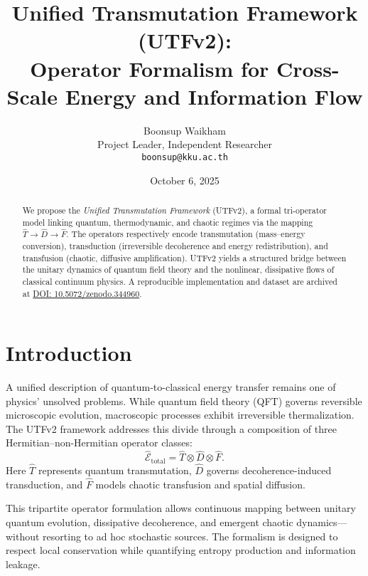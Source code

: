 \documentclass[11pt]{article}
\title{\textbf{Unified Transmutation Framework (UTFv2):\\
Operator Formalism for Cross-Scale Energy and Information Flow}}
\author{
  Boonsup Waikham\\
  \small Project Leader, Independent Researcher\\
  \small \texttt{boonsup@kku.ac.th}
}
\date{October 6, 2025}
\begin{document}
\maketitle

\begin{abstract}
We propose the \emph{Unified Transmutation Framework} (UTFv2), a formal tri-operator model 
linking quantum, thermodynamic, and chaotic regimes via the mapping
$\hat{T} \rightarrow \hat{D} \rightarrow \hat{F}$.
The operators respectively encode transmutation (mass–energy conversion),
transduction (irreversible decoherence and energy redistribution),
and transfusion (chaotic, diffusive amplification).
UTFv2 yields a structured bridge between the unitary dynamics of
quantum field theory and the nonlinear, dissipative flows of
classical continuum physics.
A reproducible implementation and dataset are archived at
\href{https://doi.org/10.5072/zenodo.344960}{DOI: 10.5072/zenodo.344960}.
\end{abstract}


\section{Introduction}

A unified description of quantum-to-classical energy transfer remains
one of physics' unsolved problems.
While quantum field theory (QFT) governs reversible microscopic
evolution, macroscopic processes exhibit irreversible thermalization.
The UTFv2 framework addresses this divide through a composition of
three Hermitian–non-Hermitian operator classes:
\begin{equation}
    \hat{\mathcal{E}}_{\mathrm{total}} = \hat{T} \otimes \hat{D} \otimes \hat{F}.
\end{equation}
Here $\hat{T}$ represents quantum transmutation,
$\hat{D}$ governs decoherence-induced transduction,
and $\hat{F}$ models chaotic transfusion and spatial diffusion.

This tripartite operator formulation allows continuous mapping between
unitary quantum evolution, dissipative decoherence, and emergent chaotic
dynamics—without resorting to ad hoc stochastic sources.
The formalism is designed to respect local conservation while
quantifying entropy production and information leakage.
\end{document}
